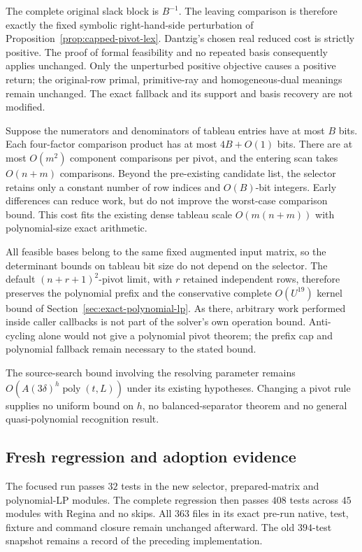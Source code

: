 The complete original slack block is $B^{-1}$.  The leaving comparison is
therefore exactly the fixed symbolic right-hand-side perturbation of
Proposition~\ref{prop:capped-pivot-lex}.  Dantzig's chosen real reduced cost
is strictly positive.  The proof of formal feasibility and no repeated
basis consequently applies unchanged.  Only the unperturbed positive
objective causes a positive return; the original-row primal, primitive-ray
and homogeneous-dual meanings remain unchanged.  The exact fallback and
its support and basis recovery are not modified.

Suppose the numerators and denominators of tableau entries have at most
$B$ bits.  Each four-factor comparison product has at most $4B+O(1)$ bits.
There are at most $O(m^2)$ component comparisons per pivot, and the entering
scan takes $O(n+m)$ comparisons.  Beyond the pre-existing candidate list,
the selector retains only a constant number of row indices and $O(B)$-bit
integers.  Early differences can reduce work, but do not improve the
worst-case comparison bound.  This cost fits the existing dense tableau
scale $O(m(n+m))$ with polynomial-size exact arithmetic.

All feasible bases belong to the same fixed augmented input matrix, so the
determinant bounds on tableau bit size do not depend on the selector.
The default $(n+r+1)^2$-pivot limit, with $r$ retained independent rows,
therefore preserves the polynomial prefix and the conservative complete
$O(U^{19})$ kernel bound of Section~\ref{sec:exact-polynomial-lp}.
As there, arbitrary work performed inside caller callbacks is not part of
the solver's own operation bound.  Anti-cycling alone would not give a
polynomial pivot theorem; the prefix cap and polynomial fallback remain
necessary to the stated bound.

The source-search bound involving the resolving parameter remains
$O(A(3\delta)^h\operatorname{poly}(t,L))$ under its existing hypotheses.
Changing a pivot rule supplies no uniform bound on $h$, no balanced-separator
theorem and no general quasi-polynomial recognition result.

\subsection{Fresh regression and adoption evidence}

The focused run passes $32$ tests in the new selector, prepared-matrix and
polynomial-LP modules.  The complete regression then passes $408$ tests
across $45$ modules with Regina and no skips.  All $363$ files in its exact
pre-run native, test, fixture and command closure remain unchanged afterward.
The old $394$-test snapshot remains a record of the preceding implementation.

